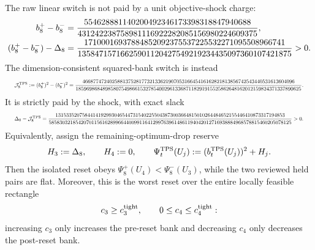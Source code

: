 \begin{proposition}
The raw linear switch is not paid by a unit objective-shock charge:
\begin{align}
 b_8^+-b_8^-
 &=\frac{554628881140200492346173398318847940688}
         {431242238758981116922282085156980224609375},
 \notag\\
 (b_8^+-b_8^-)-\Delta_8
 &=\frac{17100016937884852092375537225532271095508966741}
         {13584715716625901120427549219234435097360107421875}
 >0.
 \label{eq:path-tight-pair-linear-switch-stop}
\end{align}
The dimension-consistent squared-bank switch is instead
\begin{equation}
 \resizebox{0.98\linewidth}{!}{$
 \displaystyle
 \mathcal J_8^{\rm TPS}:=(b_8^+)^2-(b_8^-)^2
 =\frac{
 4668774724025881375281773213362190705316645416162821813856742543440531613604096}
 {185969868489858075498661532785400296133687118291915525862648162012159824371337890625}.
 $}
 \label{eq:path-tight-pair-squared-switch}
\end{equation}
It is strictly paid by the shock, with exact slack
\begin{equation}
 \resizebox{0.98\linewidth}{!}{$
 \displaystyle
 \Delta_8-\mathcal J_8^{\rm TPS}
 =\frac{
 13153352075844141929930465447315402255043873003664815010264484652155446410873317194853}
 {5858303218542070115616289966440099116412997639614861194042012716938884968578815460205078125}
 >0.
 $}
 \label{eq:path-tight-pair-switch-slack}
\end{equation}
Equivalently, assign the remaining-optimum-drop reserve
\begin{equation}
 H_3:=\Delta_8,
 \qquad H_4:=0,
 \qquad
 \Psi_t^{\rm TPS}(U_j):=(b_t^{\rm TPS}(U_j))^2+H_j.
 \label{eq:path-tight-pair-switch-rule}
\end{equation}
Then the isolated reset obeys
$\Psi_8^+(U_4)<\Psi_8^-(U_3)$, while the two reviewed held pairs are flat.
Moreover, this is the worst reset over the entire locally feasible rectangle
\begin{equation}
 c_3\geq c_3^{\rm tight},
 \qquad 0\leq c_4\leq c_4^{\rm tight}:
 \label{eq:path-tight-pair-feasible-rectangle}
\end{equation}
increasing $c_3$ only increases the pre-reset bank and decreasing $c_4$ only
decreases the post-reset bank.


\end{proposition}
